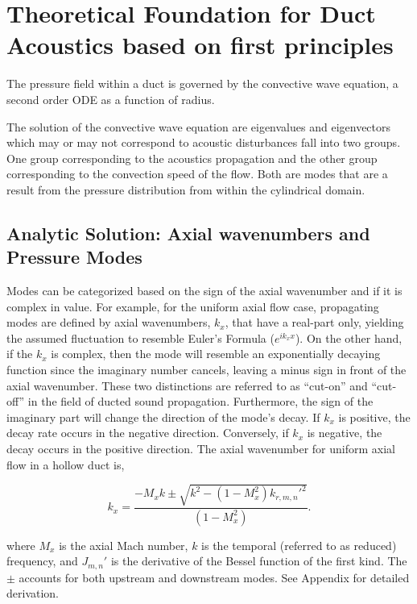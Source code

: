 \documentclass[a4paper]{report}
\begin{document}
\section{Theoretical Foundation for Duct Acoustics based on first principles}

The pressure field within a duct is governed by the convective wave equation, a
second order ODE as a function of radius. 


The solution of the convective wave equation are eigenvalues and eigenvectors 
which may or may not correspond to acoustic disturbances fall into two groups.  
One group corresponding to the acoustics propagation and the other group 
corresponding to the convection speed of the flow. Both are modes that are a
result from the pressure distribution from within the cylindrical domain.  


\subsection{ Analytic Solution: Axial wavenumbers and Pressure Modes}

Modes can be categorized based on the sign of the axial wavenumber and if it is
complex in value. For example, for the uniform axial flow case, propagating modes
are defined by axial wavenumbers, $k_x$, that have a real-part only, yielding 
the assumed fluctuation to resemble Euler's Formula ($e^{ik_x x}$). On the other 
hand, if the $k_x$ is complex, then the mode will resemble an exponentially decaying
function since the imaginary number cancels, leaving a minus sign in front of
the axial wavenumber. These two distinctions are referred to as ``cut-on'' and 
``cut-off'' in the field of ducted sound propagation. Furthermore, the sign of 
the imaginary part will change the direction of the mode's decay. If $k_x$ is 
positive, the decay rate occurs in the negative direction. Conversely, if $k_x$ 
is negative, the decay occurs in the positive direction. The axial wavenumber
for uniform axial flow in a hollow duct is,

\begin{equation}
    k_x  = \frac{- M_x k \pm \sqrt{k^2 - ( 1 - M_x^2) k_{r,m,n}'^2 }}{\left( 1 - M_x^2 \right)}.
    \label{eqn:ax_wavenumb}
\end{equation}

where $M_x$ is the axial Mach number, $k$ is the temporal (referred to as reduced)
frequency, and $J_{m,n}'$ is the derivative of the Bessel function of the first kind.  
The $\pm$ accounts for both upstream and downstream modes. See Appendix for detailed
derivation.
\end{document}
